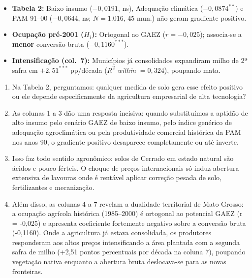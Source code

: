 \documentclass[11pt,a4paper]{article}
\begin{document}
\begin{tcolorbox}[title={\bfseries\small ÂNCORAS EMPÍRICAS E CONCEITUAIS DO SLIDE}]
\begin{itemize}[leftmargin=*,itemsep=1mm,topsep=0.5mm]
    \item \textbf{Tabela 2:} Baixo insumo ($-0{,}0191$, ns), Adequação climática ($-0{,}0874^{**}$) e PAM 91--00 ($-0{,}0644$, ns; $N=1.016$, $45$ mun.) não geram gradiente positivo.
    \item \textbf{Ocupação pré-2001 ($H_i$):} Ortogonal ao GAEZ ($r = -0{,}025$); associa-se a \textbf{menor} conversão bruta ($-0{,}1160^{***}$).
    \item \textbf{Intensificação (col.\ 7):} Municípios já consolidados expandiram milho de 2ª safra em $+2{,}51^{***}$ pp/década ($R^2$ \textit{within} $= 0{,}324$), poupando mata.
\end{itemize}
\end{tcolorbox}
\vspace{2mm}

\vspace{0.8mm}
\begin{enumerate}[leftmargin=*,label=\textbf{(\arabic*)},itemsep=2.8mm,topsep=1mm]
    \item Na Tabela 2, perguntamos: qualquer medida de solo gera esse efeito positivo ou ele depende especificamente da agricultura empresarial de alta tecnologia?
    \item As colunas 1 a 3 dão uma resposta incisiva: quando substituímos a aptidão de alto insumo pelo cenário GAEZ de baixo insumo, pelo índice genérico de adequação agroclimática ou pela produtividade comercial histórica da PAM nos anos 90, o gradiente positivo desaparece completamente ou até inverte.
    \item Isso faz todo sentido agronômico: solos de Cerrado em estado natural são ácidos e pouco férteis. O choque de preços internacionais só induz abertura extensiva de lavouras onde é rentável aplicar correção pesada de solo, fertilizantes e mecanização.
    \item Além disso, as colunas 4 a 7 revelam a dualidade territorial de Mato Grosso: a ocupação agrícola histórica (1985–2000) é ortogonal ao potencial GAEZ (r = -0,025) e apresenta coeficiente fortemente negativo sobre a conversão bruta (-0,1160). Onde a agricultura já estava consolidada, os produtores responderam aos altos preços intensificando a área plantada com a segunda safra de milho (+2,51 pontos percentuais por década na coluna 7), poupando vegetação nativa enquanto a abertura bruta deslocava-se para as novas fronteiras.
\end{enumerate}
\end{document}
